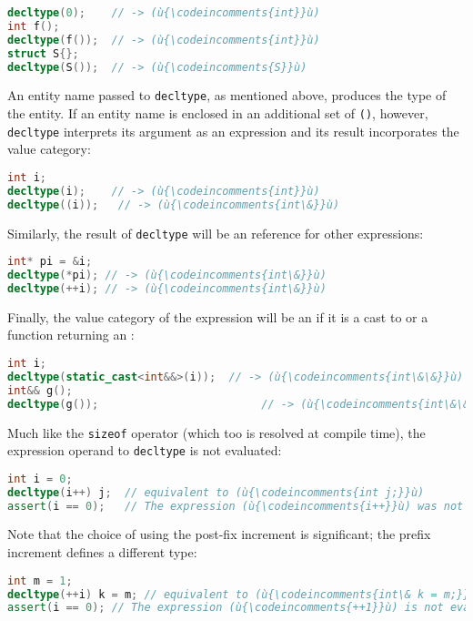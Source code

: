 \begin{lstlisting}[language=C++]
decltype(0);    // -> (ù{\codeincomments{int}}ù)
int f();
decltype(f());  // -> (ù{\codeincomments{int}}ù)
struct S{};
decltype(S());  // -> (ù{\codeincomments{S}}ù)
\end{lstlisting}

\noindent An entity name passed to \lstinline!decltype!, as mentioned above, produces the type of the entity. If an entity name is enclosed in an additional set of \lstinline!()!, however, \lstinline!decltype! interprets its argument as an expression and its result incorporates the value category:

\begin{lstlisting}[language=C++]
int i;
decltype(i);    // -> (ù{\codeincomments{int}}ù)
decltype((i));   // -> (ù{\codeincomments{int\&}}ù)
\end{lstlisting}

\noindent Similarly, the result of \lstinline!decltype! will be an  reference for other  expressions:

\begin{lstlisting}[language=C++]
int* pi = &i;
decltype(*pi); // -> (ù{\codeincomments{int\&}}ù)
decltype(++i); // -> (ù{\codeincomments{int\&}}ù)
\end{lstlisting}

\noindent Finally, the value category of the expression will be an  if it is a cast to or a function returning an :

\begin{lstlisting}[language=C++]
int i;
decltype(static_cast<int&&>(i));  // -> (ù{\codeincomments{int\&\&}}ù)
int&& g();
decltype(g());                         // -> (ù{\codeincomments{int\&\&}}ù)
\end{lstlisting}

    
\noindent Much like the \lstinline!sizeof!
operator (which too is resolved at compile time), the expression operand to \lstinline!decltype! is not evaluated:

\begin{lstlisting}[language=C++]
int i = 0;
decltype(i++) j;  // equivalent to (ù{\codeincomments{int j;}}ù)
assert(i == 0);   // The expression (ù{\codeincomments{i++}}ù) was not evaluated.
\end{lstlisting}
Note that the choice of using the post-fix increment is significant; the prefix increment defines a different type:
\begin{lstlisting}[language=C++]
int m = 1;                                                                      
decltype(++i) k = m; // equivalent to (ù{\codeincomments{int\& k = m;}}ù)                              
assert(i == 0); // The expression (ù{\codeincomments{++1}}ù) is not evaluated.    
\end{lstlisting}

